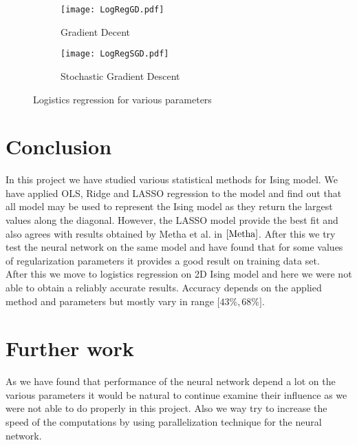 \documentclass[10pt]{article}
\begin{document}
	\begin{figure}
	\centering
	\begin{subfigure}[b]{1.0\textwidth}  
		\centering 
		\texttt{[image: LogRegGD.pdf]}
		\caption[]%
		{{\small Gradient Decent}}    
		\label{fig:LogRegGD}
	\end{subfigure}
	\hfill
	\begin{subfigure}[b]{1.0\textwidth}   
		\centering 
		\texttt{[image: LogRegSGD.pdf]}
		\caption[]%
		{{\small Stochastic Gradient Descent}}    
		\label{fig:LogRegS}
	\end{subfigure}
	\quad
	\caption[ The average and standard deviation of critical parameters ]
	{\small Logistics regression for various parameters} 
	\label{fig:LogReg}
\end{figure}




\section{Conclusion}
In this project we have studied various statistical methods for Ising model. We have applied OLS, Ridge and LASSO regression to the model and find out that all model may be used to represent the Ising model as they return the largest values along the diagonal. However, the LASSO model provide the best fit and also agrees with results obtained by Metha et al. in $\cite{Metha}$. 
After this we try test the neural network on the same model and have found that for some values of regularization parameters it provides a good result on training data set. \\
After this we move to logistics regression on 2D Ising model and here we were not able to obtain a reliably accurate results. Accuracy depends on the applied method and parameters but mostly vary in range $\lbrack 43\% , 68\% \rbrack$.\\

\section{Further work}
As we have found that performance of the neural network depend a lot on the various parameters it would be natural to continue examine their influence as we were not able to do properly in this project. Also we way try to increase the speed of the computations by using parallelization technique for the neural network.
\end{document}
